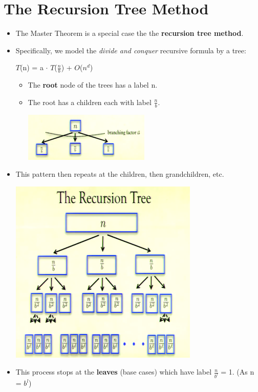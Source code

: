 \documentclass[12pt]{article}
\begin{document}
\section{The Recursion Tree Method}
\begin{itemize}
\item The Master Theorem is a special case the the \textbf{recursion tree method}.
\item Specifically, we model the \textit{divide and conquer} recursive formula by a tree:

\hspace*{\fill}\large{$T$(n) = a $\cdot$ $T$($\frac{n}{b}$) + $O$($n^d$)} \hspace*{\fill} 

	\begin{itemize}
	\item The \textbf{root} node of the trees has a label n.
	\item The root has a children each with label $\frac{n}{b}$.
	\begin{center}
	\includegraphics{lecture3l}
	\end{center}
	\end{itemize}
\item This pattern then repeats at the children, then grandchildren, etc.
\begin{center}
\includegraphics{lecture3m}
\end{center}
\item This process stops at the \textbf{leaves} (base cases) which have label $\frac{n}{b^{l}}$ = 1. (As n = $b^l$)

\end{itemize}
\end{document}
